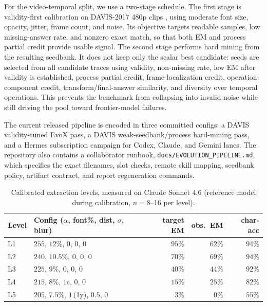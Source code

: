 For the video-temporal split, we use a two-stage schedule. The first stage is
validity-first calibration on DAVIS-2017 480p clips
\citep{davis2017}, using moderate font size, opacity, jitter, frame count, and
noise. Its objective targets readable samples, low missing-answer rate, and
nonzero exact match, so that both EM and process partial credit provide usable
signal. The second stage performs hard mining from the resulting seedbank. It
does not keep only the scalar best candidate: seeds are selected from all
candidate traces using validity, non-missing rate, low EM after validity is
established, process partial credit, frame-localization credit,
operation-component credit, transform/final-answer similarity, and diversity
over temporal operations. This prevents the benchmark from collapsing into
invalid noise while still driving the pool toward frontier-model failures.

The current released pipeline is encoded in three committed configs: a DAVIS
validity-tuned EvoX pass, a DAVIS weak-seedbank/process hard-mining pass, and a
Hermes subscription campaign for Codex, Claude, and Gemini lanes. The
repository also contains a collaborator runbook,
\texttt{docs/EVOLUTION\_PIPELINE.md}, which specifies the exact filenames,
slot checks, remote skill mapping, seedbank policy, artifact contract, and
report regeneration commands.

\begin{table}[h]
\centering\small
\caption{Calibrated extraction levels, measured on Claude Sonnet 4.6
(reference model during calibration, $n{=}8$--16 per level).}
\label{tab:ladder}
\begin{tabular}{llrrr}
\toprule
Level & Config ($\alpha$, font\%, dist, $\sigma$, blur) & target EM & obs.\ EM & char-acc \\
\midrule
L1 & $255$, $12\%$, $0$, $0$, $0$                & $95\%$ & $62\%$ & $94\%$ \\
L2 & $240$, $10.5\%$, $0$, $0$, $0$              & $70\%$ & $69\%$ & $94\%$ \\
L3 & $225$, $9\%$, $0$, $0$, $0$                 & $40\%$ & $44\%$ & $92\%$ \\
L4 & $215$, $8\%$, $1$c, $0$, $0$                & $15\%$ & $25\%$ & $82\%$ \\
L5 & $205$, $7.5\%$, $1$\,(1y), $0.5$, $0$       & $3\%$  & $0\%$  & $55\%$ \\
\bottomrule
\end{tabular}
\end{table}

